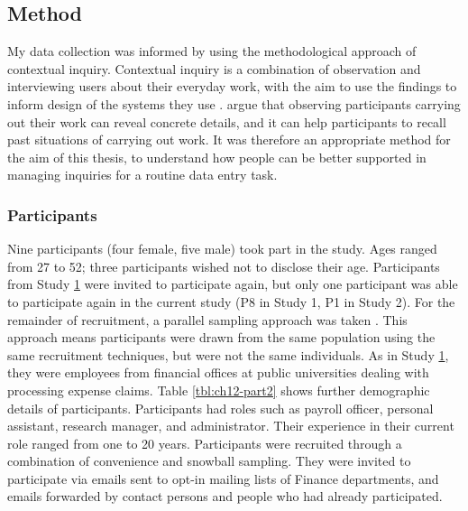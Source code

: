 \subsection{Method}
My data collection was informed by using the methodological approach of contextual inquiry. Contextual inquiry is a combination of observation and interviewing users about their everyday work, with the aim to use the findings to inform design of the systems they use \citep{Holtzblatt2014}.
\citet{Holtzblatt2014} argue that observing participants carrying out their work can reveal concrete details, and it can help participants to recall past situations of carrying out work. It was therefore an appropriate method for the aim of this thesis, to understand how people can be better supported in managing inquiries for a routine data entry task.

\subsubsection{Participants}
Nine participants (four female, five male) took part in the study. Ages ranged from 27 to 52; three participants wished not to disclose their age. Participants from Study \hyperref[st:Study1]{1} were invited to participate again, but only one participant was able to participate again in the current study (P8 in Study 1, P1 in Study 2).  For the remainder of recruitment, a parallel sampling approach was taken \citep{Onwuegbuzie2008}. This approach means participants were drawn from the same population using the same recruitment techniques, but were not the same individuals. As in Study \hyperref[st:Study1]{1}, they were employees from financial offices at public universities dealing with processing expense claims. Table \ref{tbl:ch12-part2} shows further demographic details of participants. Participants had roles such as payroll officer, personal assistant, research manager, and administrator. Their experience in their current role ranged from one to 20 years. Participants were recruited through a combination of convenience and snowball sampling. They were invited to participate via emails sent to opt-in mailing lists of Finance departments, and emails forwarded by contact persons and people who had already participated.  

